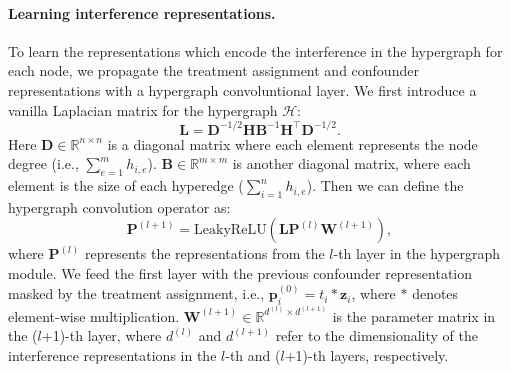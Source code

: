 \paragraph{Learning interference representations.}
To learn the representations which encode the interference in the hypergraph for each node, we propagate the treatment assignment and confounder representations with a hypergraph convoluntional layer. 
We first introduce a vanilla Laplacian matrix for the hypergraph $\mathcal{H}$:
\begin{equation}
\label{eq:laplacian}
    \mathbf{L} = \mathbf{D}^{-1/2}\mathbf{HB}^{-1}\mathbf{H}^\top\mathbf{D}^{-1/2}.
\end{equation}
Here $\mathbf{D}\in \mathbb{R}^{n\times n}$ is a diagonal matrix where each element represents the node degree (i.e., $\sum_{e=1}^m h_{i,e}$). $\mathbf{B}\in \mathbb{R}^{m\times m}$ is another diagonal matrix, where each element is the size of each hyperedge ($\sum_{i=1}^n h_{i,e}$).
Then we can define the hypergraph convolution operator as:
\begin{equation}
\label{eq: hgcn}
    \mathbf{P}^{(l+1)} = \text{LeakyReLU}\left(\mathbf{L}\mathbf{P}^{(l)}\mathbf{W}^{(l+1)}\right),
\end{equation}
where $\mathbf{P}^{(l)}$ represents the representations from the $l$-th layer in the hypergraph module. %
We feed the first layer with the previous confounder representation masked by the treatment assignment, i.e., $\mathbf{p}_i^{(0)}={t_i}*\mathbf{z}_i$,
where $*$ denotes element-wise multiplication.  
$\mathbf{W}^{(l+1)}\in \mathbb{R}^{d^{(l)}\times d^{(l+1)}}$ is the parameter matrix in the ($l$+1)-th layer, where $d^{(l)}$ and $d^{(l+1)}$ refer to the dimensionality of the interference representations in the $l$-th and ($l$+1)-th layers, respectively.


